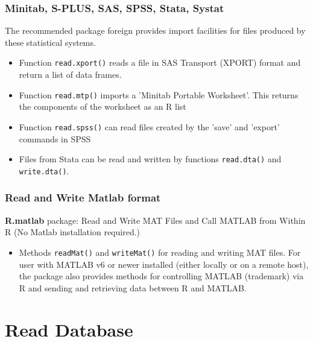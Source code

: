 \documentclass[10pt]{beamer}
\begin{document}
\begin{frame}
  \frametitle{Minitab, S-PLUS, SAS, SPSS, Stata, Systat}

  The recommended package foreign provides import facilities for files
  produced by these statistical systems.

  \begin{itemize}
  \item Function \texttt{read.xport()} reads a file in SAS Transport
    (XPORT) format and return a list of data frames.

  \item Function \texttt{read.mtp()} imports a 'Minitab Portable
    Worksheet'. This returns the components of the worksheet as an R
    list

  \item Function \texttt{read.spss()} can read files created by the
    'save' and 'export' commands in SPSS


  \item Files from Stata can be read and written by functions
    \texttt{read.dta()} and \texttt{write.dta()}.

  \end{itemize}
\end{frame}


\begin{frame}
  \frametitle{Read and Write Matlab format}

  \textbf{R.matlab} package: Read and Write MAT Files and Call MATLAB from Within R (No
  Matlab installation required.)

  \begin{itemize}
  \item Methods \texttt{readMat()} and \texttt{writeMat()} for reading and writing MAT
    files. For user with MATLAB v6 or newer installed (either locally or on a remote
    host), the package also provides methods for controlling MATLAB (trademark) via R and
    sending and retrieving data between R and MATLAB.

  \end{itemize}
\end{frame}

\section{Read Database}
\end{document}
